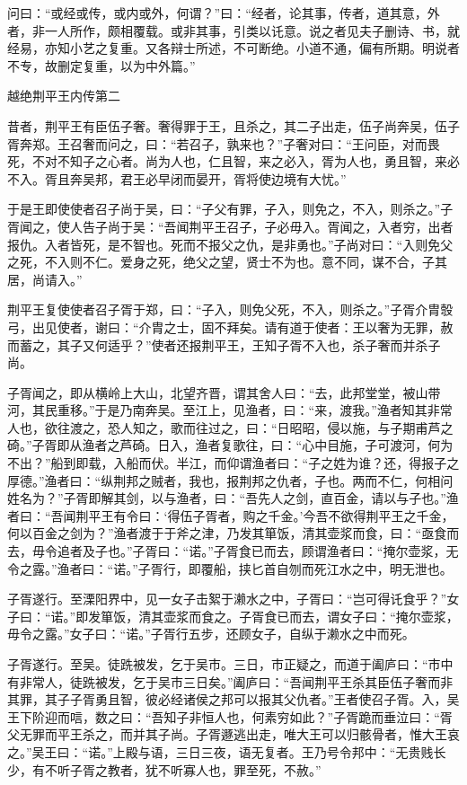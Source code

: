 \documentclass[12pt,UTF8]{ctexbook}
\begin{document}
问曰：“或经或传，或内或外，何谓？”曰：“经者，论其事，传者，道其意，外者，非一人所作，颇相覆载。或非其事，引类以讬意。说之者见夫子删诗、书，就经易，亦知小艺之复重。又各辩士所述，不可断绝。小道不通，偏有所期。明说者不专，故删定复重，以为中外篇。”

越绝荆平王内传第二

昔者，荆平王有臣伍子奢。奢得罪于王，且杀之，其二子出走，伍子尚奔吴，伍子胥奔郑。王召奢而问之，曰：“若召子，孰来也？”子奢对曰：“王问臣，对而畏死，不对不知子之心者。尚为人也，仁且智，来之必入，胥为人也，勇且智，来必不入。胥且奔吴邦，君王必早闭而晏开，胥将使边境有大忧。”

于是王即使使者召子尚于吴，曰：“子父有罪，子入，则免之，不入，则杀之。”子胥闻之，使人告子尚于吴：“吾闻荆平王召子，子必毋入。胥闻之，入者穷，出者报仇。入者皆死，是不智也。死而不报父之仇，是非勇也。”子尚对曰：“入则免父之死，不入则不仁。爱身之死，绝父之望，贤士不为也。意不同，谋不合，子其居，尚请入。”

荆平王复使使者召子胥于郑，曰：“子入，则免父死，不入，则杀之。”子胥介胄彀弓，出见使者，谢曰：“介胄之士，固不拜矣。请有道于使者：王以奢为无罪，赦而蓄之，其子又何适乎？”使者还报荆平王，王知子胥不入也，杀子奢而并杀子尚。

子胥闻之，即从横岭上大山，北望齐晋，谓其舍人曰：“去，此邦堂堂，被山带河，其民重移。”于是乃南奔吴。至江上，见渔者，曰：“来，渡我。”渔者知其非常人也，欲往渡之，恐人知之，歌而往过之，曰：“日昭昭，侵以施，与子期甫芦之碕。”子胥即从渔者之芦碕。日入，渔者复歌往，曰：“心中目施，子可渡河，何为不出？”船到即载，入船而伏。半江，而仰谓渔者曰：“子之姓为谁？还，得报子之厚德。”渔者曰：“纵荆邦之贼者，我也，报荆邦之仇者，子也。两而不仁，何相问姓名为？”子胥即解其剑，以与渔者，曰：“吾先人之剑，直百金，请以与子也。”渔者曰：“吾闻荆平王有令曰：‘得伍子胥者，购之千金。’今吾不欲得荆平王之千金，何以百金之剑为？”渔者渡于于斧之津，乃发其箪饭，清其壶浆而食，曰：“亟食而去，毋令追者及子也。”子胥曰：“诺。”子胥食已而去，顾谓渔者曰：“掩尔壶浆，无令之露。”渔者曰：“诺。”子胥行，即覆船，挟匕首自刎而死江水之中，明无泄也。

子胥遂行。至溧阳界中，见一女子击絮于濑水之中，子胥曰：“岂可得讬食乎？”女子曰：“诺。”即发箪饭，清其壶浆而食之。子胥食已而去，谓女子曰：“掩尔壶浆，毋令之露。”女子曰：“诺。”子胥行五步，还顾女子，自纵于濑水之中而死。

子胥遂行。至吴。徒跣被发，乞于吴市。三日，市正疑之，而道于阖庐曰：“市中有非常人，徒跣被发，乞于吴市三日矣。”阖庐曰：“吾闻荆平王杀其臣伍子奢而非其罪，其子子胥勇且智，彼必经诸侯之邦可以报其父仇者。”王者使召子胥。入，吴王下阶迎而唁，数之曰：“吾知子非恒人也，何素穷如此？”子胥跪而垂泣曰：“胥父无罪而平王杀之，而并其子尚。子胥遯逃出走，唯大王可以归骸骨者，惟大王哀之。”吴王曰：“诺。”上殿与语，三日三夜，语无复者。王乃号令邦中：“无贵贱长少，有不听子胥之教者，犹不听寡人也，罪至死，不赦。”
\end{document}
